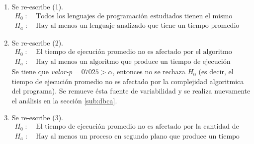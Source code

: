 \documentclass[11pt,a4paper]{article}
\begin{document}
\begin{enumerate}
	\item[\fbox{Hip. Principal}] Se re-escribe (1).
		\[
			\begin{array}{rl}
				H_0 \;:\; & \mbox{Todos los lenguajes de programación estudiados tienen el mismo tiempo de ejecución promedio.} \\
				H_a \;:\; & \mbox{Hay al menos un lenguaje analizado que tiene un tiempo promedio de ejecución diferente.}
			\end{array}
		\]
	\item[\fbox{Hip. Secundaria 1}] Se re-escribe (2).
		\[
			\begin{array}{rl}
				H_0 \;:\; & \mbox{El tiempo de ejecución promedio no es afectado por el algoritmo programado.} \\
				H_a \;:\; & \mbox{Hay al menos un algoritmo que produce un tiempo de ejecución promedio diferente.}
			\end{array}
		\]
		Se tiene que \textit{valor-p\(= 07025 > \alpha\)}, entonces no se rechaza \(H_0\) (es decir, el tiempo de ejecución promedio no es afectado por la complejidad algoritmica del programa).
		Se remueve ésta fuente de variabilidad y se realiza nuevamente el análisis en la sección \ref{sub:dbca}.
	\item[\fbox{Hip. Secundaria 2}] Se re-escribe (3).
		\[
			\begin{array}{rl}
				H_0 \;:\; & \mbox{El tiempo de ejecución promedio no es afectado por la cantidad de procesos en segundo plano.} \\
				H_a \;:\; & \mbox{Hay al menos un proceso en segundo plano que produce un tiempo de ejecución promedio diferente.}
			\end{array}
		\]
\end{enumerate}
\end{document}
